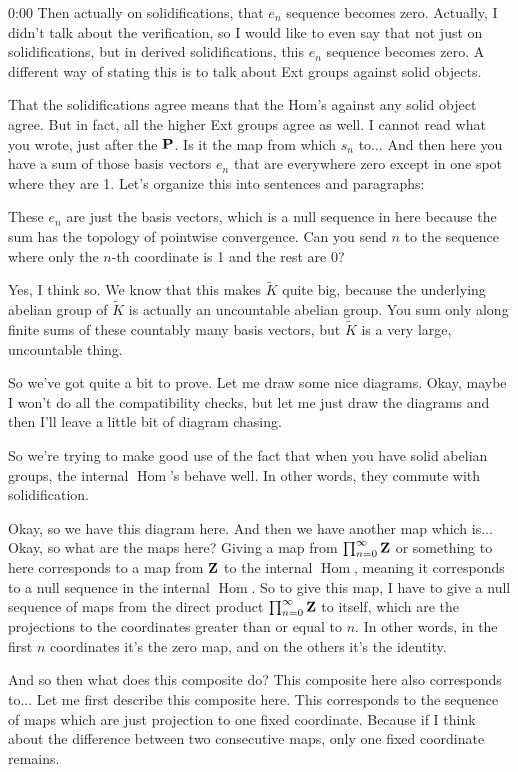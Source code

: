 \begin{unfinished}{0:00}
Then actually on solidifications, that $e_n$ sequence becomes zero. Actually, I didn't talk about the verification, so I would like to even say that not just on solidifications, but in derived solidifications, this $e_n$ sequence becomes zero. A different way of stating this is to talk about Ext groups against solid objects.

That the solidifications agree means that the $\text{Hom}$'s against any solid object agree. But in fact, all the higher Ext groups agree as well. I cannot read what you wrote, just after the $\P$. Is it the map from which $s_n$ to... And then here you have a sum of those basis vectors $e_n$ that are everywhere zero except in one spot where they are 1.
Let's organize this into sentences and paragraphs:

These $e_n$ are just the basis vectors, which is a null sequence in here because the sum has the topology of pointwise convergence. Can you send $n$ to the sequence where only the $n$-th coordinate is 1 and the rest are 0?

Yes, I think so. We know that this makes $\tilde{K}$ quite big, because the underlying abelian group of $\tilde{K}$ is actually an uncountable abelian group. You sum only along finite sums of these countably many basis vectors, but $\tilde{K}$ is a very large, uncountable thing.

So we've got quite a bit to prove. Let me draw some nice diagrams. Okay, maybe I won't do all the compatibility checks, but let me just draw the diagrams and then I'll leave a little bit of diagram chasing.

So we're trying to make good use of the fact that when you have solid abelian groups, the internal $\operatorname{Hom}$'s behave well. In other words, they commute with solidification.

Okay, so we have this diagram here. And then we have another map which is... Okay, so what are the maps here? Giving a map from $\prod_{n=0}^\infty \Z$ or something to here corresponds to a map from $\Z$ to the internal $\operatorname{Hom}$, meaning it corresponds to a null sequence in the internal $\operatorname{Hom}$. So to give this map, I have to give a null sequence of maps from the direct product $\prod_{n=0}^\infty \Z$ to itself, which are the projections to the coordinates greater than or equal to $n$. In other words, in the first $n$ coordinates it's the zero map, and on the others it's the identity.

And so then what does this composite do? This composite here also corresponds to... Let me first describe this composite here. This corresponds to the sequence of maps which are just projection to one fixed coordinate. Because if I think about the difference between two consecutive maps, only one fixed coordinate remains.


\end{unfinished}
